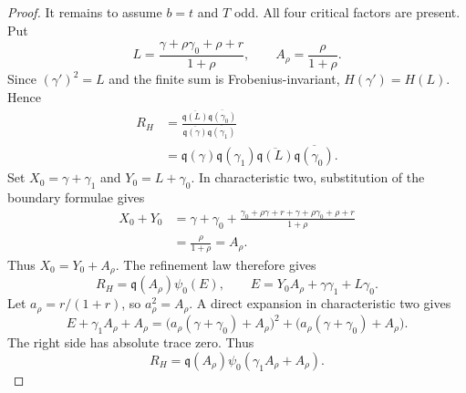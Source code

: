 \documentclass[11pt]{amsart}
\theoremstyle{definition}
\theoremstyle{remark}
\begin{document}
\begin{proof}
It remains to assume $b=t$ and $T$ odd.  All four critical factors are
present.  Put
\[
 L=\frac{\gamma+\rho\gamma_0+\rho+r}{1+\rho},
 \qquad A_\rho=\frac{\rho}{1+\rho}.
\]
Since $(\gamma')^2=L$ and the finite sum is Frobenius-invariant,
$H(\gamma')=H(L)$.  Hence
\begin{align*}
 R_H
 &=\frac{\overline{\mathfrak q(L)}
          \overline{\mathfrak q(\gamma_0)}}
         {\overline{\mathfrak q(\gamma)}
          \overline{\mathfrak q(\gamma_1)}}\\
 &=\mathfrak q(\gamma)\mathfrak q(\gamma_1)
   \overline{\mathfrak q(L)}\overline{\mathfrak q(\gamma_0)}.
\end{align*}
Set $X_0=\gamma+\gamma_1$ and $Y_0=L+\gamma_0$.  In characteristic
two, substitution of the boundary formulae gives
\begin{align*}
 X_0+Y_0
 &=\gamma+\gamma_0
   +\frac{\gamma_0+\rho\gamma+r
          +\gamma+\rho\gamma_0+\rho+r}{1+\rho}\\
 &=\frac{\rho}{1+\rho}=A_\rho.
\end{align*}
Thus $X_0=Y_0+A_\rho$.  The refinement law therefore gives
\begin{equation}\label{eq:quadratic-boundary-raw-intermediate}
 R_H=\mathfrak q(A_\rho)\psi_0(E),
 \qquad
 E=Y_0A_\rho+\gamma\gamma_1+L\gamma_0.
\end{equation}
Let $a_\rho=r/(1+r)$, so $a_\rho^2=A_\rho$.  A direct expansion in
characteristic two gives
\begin{equation}\label{eq:quadratic-boundary-AS-difference}
 E+\gamma_1A_\rho+A_\rho
 =\bigl(a_\rho(\gamma+\gamma_0)+A_\rho\bigr)^2
  +\bigl(a_\rho(\gamma+\gamma_0)+A_\rho\bigr).
\end{equation}
The right side has absolute trace zero.  Thus
\begin{equation}\label{eq:quadratic-boundary-raw-Hasse}
 R_H=\mathfrak q(A_\rho)
      \psi_0(\gamma_1A_\rho+A_\rho).
\end{equation}


\end{proof}
\end{document}
